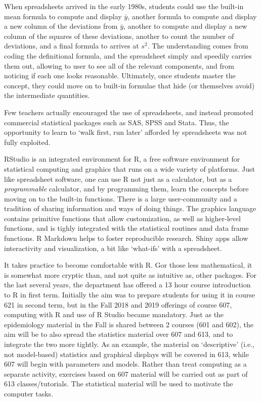 \documentclass[]{book}
\begin{document}
When spreadsheets arrived in the early 1980s, students could use the built-in mean formula to compute and display \(\bar{y}\), another formula to compute and display a new column of the deviations from \(\bar{y}\), another to compute and display a new column of the squares of these deviations, another to count the number of deviations, and a final formula to arrives at \(s^2.\) The understanding comes from coding the definitional formula, and the spreadsheet simply and speedily carries them out, allowing to user to see all of the relevant components, and from noticing if each one looks reasonable. Ultimately, once students master the concept, they could move on to built-in formulae that hide (or themselves avoid) the intermediate quantities.

Few teachers actually encouraged the use of spreadsheets, and instead promoted commercial statistical packages such as SAS, SPSS and Stata.
Thus, the opportunity to learn to `walk first, run later' afforded by spreadsheets was not fully exploited.

RStudio is an integrated environment for R, a free software environment for statistical computing and graphics that runs on a wide variety of platforms. Just like spreadsheet software, one can use R not just as a calculator, but as a \emph{programmable} calculator, and by programming them, learn the concepts before moving on to the built-in functions. There is a large user-community and a tradition of sharing information and ways of doing things. The graphics language contains primitive functions that allow customization, as well as higher-level functions, and is tighly integrated with the statistical routines amd data frame functions. R Markdown helps to foster reproducible research. Shiny apps allow interactivity and visualization, a bit like `what-ifs' with a spreadsheet.

It takes practice to become comfortable with R. Gor those less mathematical, it is somewhat more cryptic than, and not quite as intuitive as, other packages. For the last several years, the department has offered a 13 hour course introduction to R in first term. Initially the aim was to prepare students for using it in course 621 in second term, but in the Fall 2018 and 2019 offerings of course 607, computing with R and use of R Studio became mandatory. Just as the epidemiology material in the Fall is shared between 2 courses (601 and 602), the aim will be to also spread the statistics material over 607 and 613, and to integrate the two more tightly. As an example, the material on `descriptive' (i.e., not model-based) statistics and graphical displays will be covered in 613, while 607 will begin with parameters and models. Rather than treat computing as a separate activity, exercises based on 607 material will be carried out as part of 613 classes/tutorials. The statistical material will be used to motivate the computer tasks.
\end{document}
